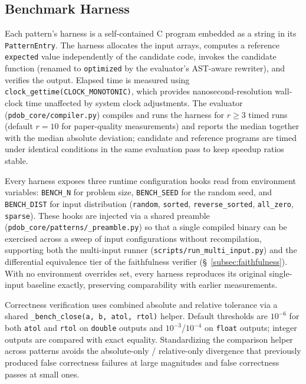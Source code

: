 \subsection{Benchmark Harness}

Each pattern's harness is a self-contained C program embedded as a string in its \texttt{PatternEntry}. The harness allocates the input arrays, computes a reference \texttt{expected} value independently of the candidate code, invokes the candidate function (renamed to \texttt{optimized} by the evaluator's AST-aware rewriter), and verifies the output. Elapsed time is measured using \texttt{clock\_gettime(CLOCK\_MONOTONIC)}, which provides nanosecond-resolution wall-clock time unaffected by system clock adjustments. The evaluator (\texttt{pdob\_core/compiler.py}) compiles and runs the harness for $r \geq 3$ timed runs (default $r=10$ for paper-quality measurements) and reports the median together with the median absolute deviation; candidate and reference programs are timed under identical conditions in the same evaluation pass to keep speedup ratios stable.

Every harness exposes three runtime configuration hooks read from environment variables: \texttt{BENCH\_N} for problem size, \texttt{BENCH\_SEED} for the random seed, and \texttt{BENCH\_DIST} for input distribution (\texttt{random}, \texttt{sorted}, \texttt{reverse\_sorted}, \texttt{all\_zero}, \texttt{sparse}). These hooks are injected via a shared preamble (\texttt{pdob\_core/patterns/\_preamble.py}) so that a single compiled binary can be exercised across a sweep of input configurations without recompilation, supporting both the multi-input runner (\texttt{scripts/run\_multi\_input.py}) and the differential equivalence tier of the faithfulness verifier (\S~\ref{subsec:faithfulness}). With no environment overrides set, every harness reproduces its original single-input baseline exactly, preserving comparability with earlier measurements.

Correctness verification uses combined absolute and relative tolerance via a shared \texttt{\_bench\_close(a, b, atol, rtol)} helper. Default thresholds are $10^{-6}$ for both \texttt{atol} and \texttt{rtol} on \texttt{double} outputs and $10^{-3}$/$10^{-4}$ on \texttt{float} outputs; integer outputs are compared with exact equality. Standardizing the comparison helper across patterns avoids the absolute-only / relative-only divergence that previously produced false correctness failures at large magnitudes and false correctness passes at small ones.

